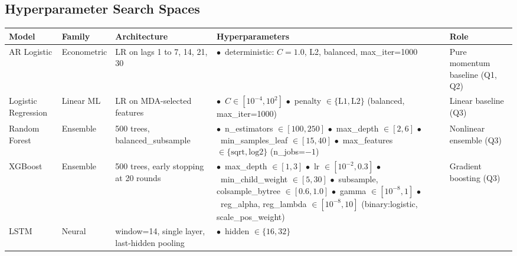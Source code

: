 \documentclass[12pt,a4paper,oneside]{article}
\begin{document}

\subsection{Hyperparameter Search Spaces}\label{app:hyperparams}

\begin{table}[H]
\centering
\footnotesize
\begin{tabular}{p{1.5cm}p{1.7cm}p{2.3cm}p{5.0cm}p{2.0cm}}
\toprule
Model & Family & Architecture & Hyperparameters & Role \\
\midrule
AR Logistic & Econometric & LR on lags 1 to 7, 14, 21, 30 & $\bullet$\ deterministic: $C=1.0$, L2, balanced, max\_iter=1000 & Pure momentum baseline (Q1, Q2) \\
Logistic Regression & Linear ML & LR on MDA-selected features &
$\bullet$\ $C \in [10^{-4}, 10^{2}]$ \newline
$\bullet$\ penalty $\in \{\text{L1}, \text{L2}\}$ \newline
(balanced, max\_iter=1000)
& Linear baseline (Q3) \\
Random Forest & Ensemble & 500 trees, balanced\_subsample &
$\bullet$\ n\_estimators $\in [100, 250]$ \newline
$\bullet$\ max\_depth $\in [2, 6]$ \newline
$\bullet$\ min\_samples\_leaf $\in [15, 40]$ \newline
$\bullet$\ max\_features $\in \{\text{sqrt}, \text{log2}\}$ \newline
(n\_jobs=$-1$)
& Nonlinear ensemble (Q3) \\
XGBoost & Ensemble & 500 trees, early stopping at 20 rounds &
$\bullet$\ max\_depth $\in [1, 3]$ \newline
$\bullet$\ lr $\in [10^{-2}, 0.3]$ \newline
$\bullet$\ min\_child\_weight $\in [5, 30]$ \newline
$\bullet$\ subsample, colsample\_bytree $\in [0.6, 1.0]$ \newline
$\bullet$\ gamma $\in [10^{-8}, 1]$ \newline
$\bullet$\ reg\_alpha, reg\_lambda $\in [10^{-8}, 10]$ \newline
(binary:logistic, scale\_pos\_weight)
& Gradient boosting (Q3) \\
LSTM & Neural & window=14, single layer, last-hidden pooling &
$\bullet$\ hidden $\in \{16, 32\}$ \newline

\end{tabular}
\end{table}
\end{document}
